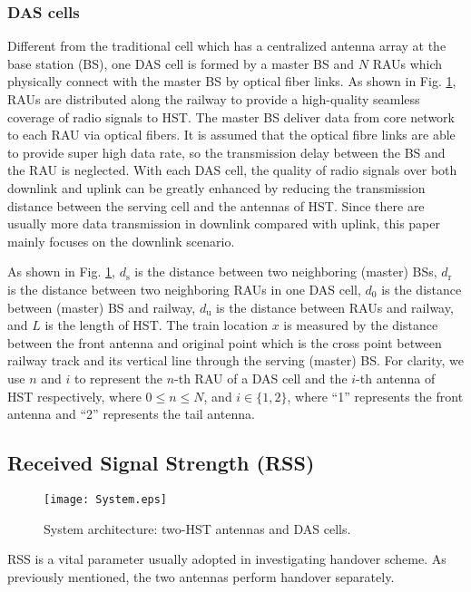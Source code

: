 \documentclass[a4paper,twocolumn,10pt]{IEEEtran}
\newcommand{\picspace}{{\vspace{-0.1 in}}}
\begin{document}
\subsubsection{DAS cells} Different from the traditional cell which has a centralized antenna array at the base station (BS), one DAS cell is formed by a master BS and $N$ RAUs which physically connect with the master BS by optical fiber links. As shown in Fig. \ref{system}, RAUs are distributed along the railway to provide a high-quality seamless coverage of radio signals to HST. The master BS deliver data from core network to each RAU via optical fibers. It is assumed that the optical fibre links are able to provide super high data rate, so the transmission delay between the BS and the RAU is neglected. With each DAS cell, the quality of radio signals over both downlink and uplink can be greatly enhanced by reducing the transmission distance between the serving cell and the antennas of HST. Since there are usually more data transmission in downlink compared with uplink, this paper mainly focuses on the downlink scenario.

 As shown in Fig. \ref{system}, $d_\textrm{s}$ is the distance between two neighboring (master) BSs, $d_\textrm{r}$ is the distance between two neighboring RAUs in one DAS cell, $d_\textrm{0}$ is the distance between (master) BS and railway, $d_\textrm{u}$ is the distance between RAUs and railway, and $L$ is the length of HST. The train location $x$ is measured by the distance between the front antenna and original point which is the cross point between railway track and its vertical line through the serving (master) BS. For clarity, we use $n$ and $i$ to represent the $n$-th RAU of a DAS cell and the $i$-th antenna of HST respectively, where $0 \le n \le N$, and $i\in \{1,2\}$, where ``1'' represents the front antenna and ``2'' represents the tail antenna.

\subsection{Received Signal Strength (RSS)}

\begin{figure}
\centering
\texttt{[image: System.eps]}
\caption{System architecture: two-HST antennas and DAS cells.}
\label{system}\picspace
\end{figure}


RSS is a vital parameter usually adopted in investigating handover scheme. As previously mentioned, the two antennas perform handover separately.
\end{document}
